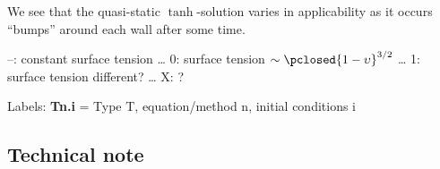 We see that the quasi-static $\tanh$-solution varies in applicability as it occurs ``bumps'' around each wall after some time.

--: constant surface tension \dots
0: surface tension $\sim \pclosed{ 1 - \upsilon }^{3/2}$ \dots
1: surface tension different? \dots
X: ?

Labels: \textsf{\textbf{Tn.i}} = Type T, equation/method n, initial conditions i





\subsection{Technical note}


